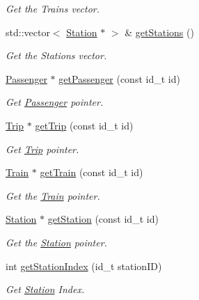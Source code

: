 \begin{DoxyCompactItemize}
\begin{DoxyCompactList}\small\item\em Get the Trains vector. \end{DoxyCompactList}\item 
std\+::vector$<$ \mbox{\hyperlink{classStation}{Station}} $\ast$ $>$ \& \mbox{\hyperlink{classSystem_a6f27512fba42cc093efd34fe10bf0045}{get\+Stations}} ()
\begin{DoxyCompactList}\small\item\em Get the Stations vector. \end{DoxyCompactList}\item 
\mbox{\hyperlink{classPassenger}{Passenger}} $\ast$ \mbox{\hyperlink{classSystem_a5a0348802d5cdb666f330b1e10d32727}{get\+Passenger}} (const id\+\_\+t id)
\begin{DoxyCompactList}\small\item\em Get \mbox{\hyperlink{classPassenger}{Passenger}} pointer. \end{DoxyCompactList}\item 
\mbox{\hyperlink{classTrip}{Trip}} $\ast$ \mbox{\hyperlink{classSystem_a518ff04299c8b37d3cbec814ac0b7ec6}{get\+Trip}} (const id\+\_\+t id)
\begin{DoxyCompactList}\small\item\em Get \mbox{\hyperlink{classTrip}{Trip}} pointer. \end{DoxyCompactList}\item 
\mbox{\hyperlink{classTrain}{Train}} $\ast$ \mbox{\hyperlink{classSystem_ac29b91a9dca7dd1bb4c39769a75d444f}{get\+Train}} (const id\+\_\+t id)
\begin{DoxyCompactList}\small\item\em Get the \mbox{\hyperlink{classTrain}{Train}} pointer. \end{DoxyCompactList}\item 
\mbox{\hyperlink{classStation}{Station}} $\ast$ \mbox{\hyperlink{classSystem_aaadc55451a0d43b7ba98ff5377de8e02}{get\+Station}} (const id\+\_\+t id)
\begin{DoxyCompactList}\small\item\em Get the \mbox{\hyperlink{classStation}{Station}} pointer. \end{DoxyCompactList}\item 
int \mbox{\hyperlink{classSystem_a231710db7f31b3fec68f90fd90b292eb}{get\+Station\+Index}} (id\+\_\+t station\+ID)
\begin{DoxyCompactList}\small\item\em Get \mbox{\hyperlink{classStation}{Station}} Index. \end{DoxyCompactList}\item 

\end{DoxyCompactItemize}
